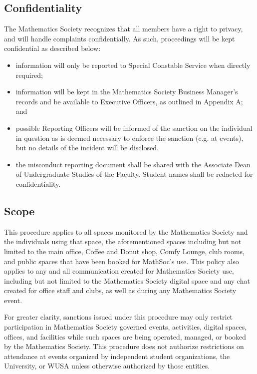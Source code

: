 \subsection{Confidentiality}
The Mathematics Society recognizes that all members have a right to privacy, and will handle complaints confidentially. As such, proceedings will be kept confidential as described below:
\begin{itemize}
	\item information will only be reported to Special Constable Service when directly required;
	\item information will be kept in the Mathematics Society Business Manager's records and be available to Executive Officers, as outlined in Appendix A; and
	\item possible Reporting Officers will be informed of the sanction on the individual in question as is deemed necessary to enforce the sanction (e.g. at events), but no details of the incident will be disclosed.
	\item the misconduct reporting document shall be shared with the Associate Dean of Undergraduate Studies of the Faculty.  Student names shall be redacted for confidentiality.
\end{itemize}

\subsection{Scope}
This procedure applies to all spaces monitored by the Mathematics Society and the individuals using that space, the aforementioned spaces including but not limited to the main office, Coffee and Donut shop, Comfy Lounge, club rooms, and public spaces that have been booked for MathSoc's use. This policy also applies to any and all communication created for Mathematics Society use, including but not limited to the Mathematics Society digital space and any chat created for office staff and clubs, as well as during any Mathematics Society event.

For greater clarity, sanctions issued under this procedure may only restrict participation in Mathematics Society governed events, activities, digital spaces, offices, and facilities while such spaces are being operated, managed, or booked by the Mathematics Society. This procedure does not authorize restrictions on attendance at events organized by independent student organizations, the University, or WUSA unless otherwise authorized by those entities.